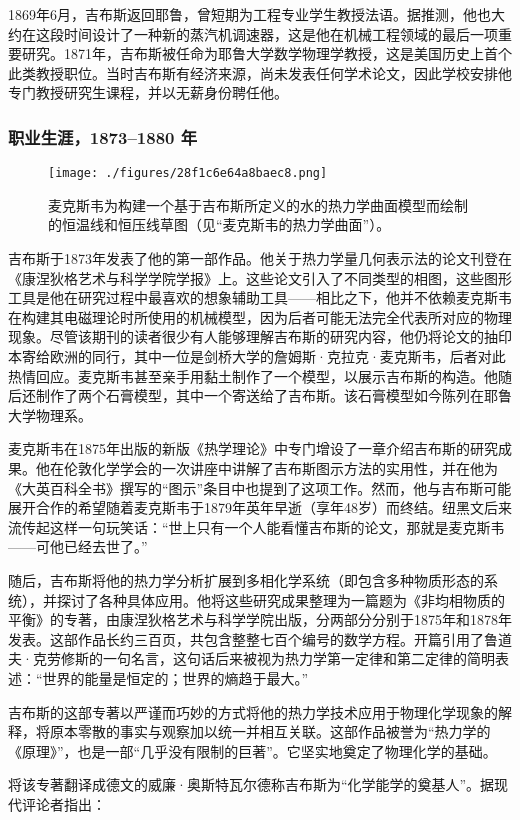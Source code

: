 1869年6月，吉布斯返回耶鲁，曾短期为工程专业学生教授法语。据推测，他也大约在这段时间设计了一种新的蒸汽机调速器，这是他在机械工程领域的最后一项重要研究。1871年，吉布斯被任命为耶鲁大学数学物理学教授，这是美国历史上首个此类教授职位。当时吉布斯有经济来源，尚未发表任何学术论文，因此学校安排他专门教授研究生课程，并以无薪身份聘任他。
\subsubsection{职业生涯，1873–1880 年}
\begin{figure}[ht]
\centering
\texttt{[image: ./figures/28f1c6e64a8baec8.png]}
\caption{麦克斯韦为构建一个基于吉布斯所定义的水的热力学曲面模型而绘制的恒温线和恒压线草图（见“麦克斯韦的热力学曲面”）。} \label{fig_QSY_3}
\end{figure}
吉布斯于1873年发表了他的第一部作品。他关于热力学量几何表示法的论文刊登在《康涅狄格艺术与科学学院学报》上。这些论文引入了不同类型的相图，这些图形工具是他在研究过程中最喜欢的想象辅助工具——相比之下，他并不依赖麦克斯韦在构建其电磁理论时所使用的机械模型，因为后者可能无法完全代表所对应的物理现象。尽管该期刊的读者很少有人能够理解吉布斯的研究内容，他仍将论文的抽印本寄给欧洲的同行，其中一位是剑桥大学的詹姆斯·克拉克·麦克斯韦，后者对此热情回应。麦克斯韦甚至亲手用黏土制作了一个模型，以展示吉布斯的构造。他随后还制作了两个石膏模型，其中一个寄送给了吉布斯。该石膏模型如今陈列在耶鲁大学物理系。

麦克斯韦在1875年出版的新版《热学理论》中专门增设了一章介绍吉布斯的研究成果。他在伦敦化学学会的一次讲座中讲解了吉布斯图示方法的实用性，并在他为《大英百科全书》撰写的“图示”条目中也提到了这项工作。然而，他与吉布斯可能展开合作的希望随着麦克斯韦于1879年英年早逝（享年48岁）而终结。纽黑文后来流传起这样一句玩笑话：“世上只有一个人能看懂吉布斯的论文，那就是麦克斯韦——可他已经去世了。”

随后，吉布斯将他的热力学分析扩展到多相化学系统（即包含多种物质形态的系统），并探讨了各种具体应用。他将这些研究成果整理为一篇题为《非均相物质的平衡》的专著，由康涅狄格艺术与科学学院出版，分两部分分别于1875年和1878年发表。这部作品长约三百页，共包含整整七百个编号的数学方程。开篇引用了鲁道夫·克劳修斯的一句名言，这句话后来被视为热力学第一定律和第二定律的简明表述：“世界的能量是恒定的；世界的熵趋于最大。”

吉布斯的这部专著以严谨而巧妙的方式将他的热力学技术应用于物理化学现象的解释，将原本零散的事实与观察加以统一并相互关联。这部作品被誉为“热力学的《原理》”，也是一部“几乎没有限制的巨著”。它坚实地奠定了物理化学的基础。

将该专著翻译成德文的威廉·奥斯特瓦尔德称吉布斯为“化学能学的奠基人”。据现代评论者指出：

